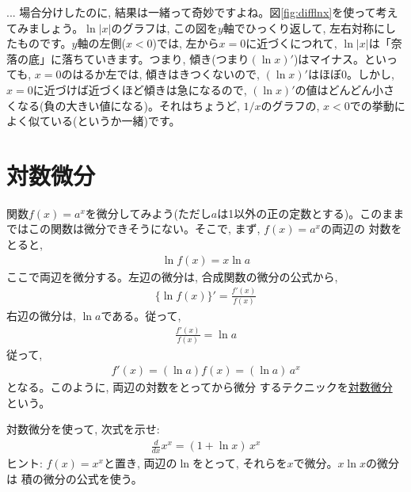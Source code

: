 \begin{faq}\small{ ... 場合分けしたのに, 結果は一緒って奇妙ですよね。図\ref{fig:difflnx}を使って考えてみましょう。$\ln |x|$のグラフは, この図を$y$軸でひっくり返して, 左右対称にしたものです。$y$軸の左側($x<0$)では, 左から$x=0$に近づくにつれて, $\ln |x|$は「奈落の底」に落ちていきます。つまり, 傾き(つまり$(\ln x)'$)はマイナス。といっても, $x=0$のはるか左では, 傾きはきつくないので, $(\ln x)'$はほぼ0。しかし, $x=0$に近づけば近づくほど傾きは急になるので, $(\ln x)'$の値はどんどん小さくなる(負の大きい値になる)。それはちょうど, $1/x$のグラフの, $x<0$での挙動によく似ている(というか一緒)です。}\end{faq}
\mv




\section{対数微分}

関数$f(x)=a^x$を微分してみよう(ただし$a$は1以外の正の定数とする)。このままではこの関数は微分できそうにない。そこで, まず, $f(x)=a^x$の両辺の
対数をとると, 
\begin{eqnarray}\ln f(x)=x\ln a\end{eqnarray}
ここで両辺を微分する。左辺の微分は, 合成関数の微分の公式から, 
\begin{eqnarray}\{\ln f(x)\}'=\frac{f'(x)}{f(x)}\end{eqnarray}
右辺の微分は, $\ln a$である。従って, 
\begin{eqnarray}\frac{f'(x)}{f(x)}=\ln a\end{eqnarray}
従って, 
\begin{eqnarray}f'(x)=(\ln a)f(x)=(\ln a)\,a^x\label{eq_diff_ax}\end{eqnarray}
となる。このように, 両辺の対数をとってから微分
するテクニックを\underline{対数微分} という。\hv

\begin{q}\label{q:exp_diffxpowx} 対数微分を使って, 次式を示せ:
\begin{eqnarray}\frac{d}{dx}x^x=(1+\ln x)\,x^x\label{eq_diff_xx}\end{eqnarray}
ヒント: $f(x)=x^x$と置き, 両辺の$\ln$をとって, それらを$x$で微分。$x\ln x$の微分は
積の微分の公式を使う。
\end{q}

